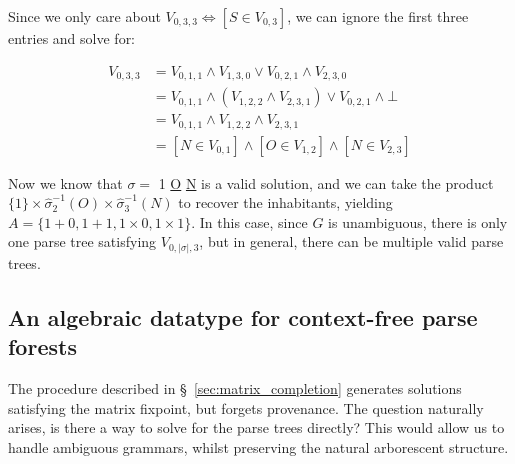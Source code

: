\documentclass[sigplan,acmsmall,nonacm,screen]{acmart}\settopmatter{printfolios=false,printccs=false,printacmref=false}
\begin{document}
  \noindent Since we only care about $V_{0, 3, 3} \Leftrightarrow [S \in V_{0, 3}]$, we can ignore the first three entries and solve for:\vspace{-8pt}

  \begin{align*}
    V_{0, 3, 3} &= V_{0, 1, 1} \land V_{1, 3, 0} \lor V_{0, 2, 1} \land V_{2, 3, 0}\\
    &= V_{0, 1, 1} \land (V_{1, 2, 2} \land V_{2, 3, 1}) \lor V_{0, 2, 1} \land \bot\\
    &= V_{0, 1, 1} \land V_{1, 2, 2} \land V_{2, 3, 1}\\
    &= [N \in V_{0, 1}] \land [O \in V_{1, 2}] \land [N \in V_{2, 3}]
  \end{align*}

  Now we know that $\sigma =$ 1 \underline{O} \underline{N} is a valid solution, and we can take the product $\{1\}\times \hat\sigma_2^{-1}(O) \times \hat\sigma_3^{-1}(N)$ to recover the inhabitants, yielding $A=\{1+0, 1+1, 1\times 0, 1\times 1\}$. In this case, since $G$ is unambiguous, there is only one parse tree satisfying $V_{0, |\sigma|, 3}$, but in general, there can be multiple valid parse trees.

  \subsection{An algebraic datatype for context-free parse forests}\label{sec:ptree}

  The procedure described in \S~\ref{sec:matrix_completion} generates solutions satisfying the matrix fixpoint, but forgets provenance. The question naturally arises, is there a way to solve for the parse trees directly? This would allow us to handle ambiguous grammars, whilst preserving the natural arborescent structure.
\end{document}
